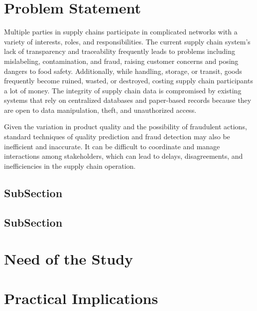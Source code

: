 \section{Problem Statement}
\noindent
Multiple parties in supply chains participate in complicated networks with a variety of interests, roles, and responsibilities. 
The current supply chain system's lack of transparency and traceability frequently leads to problems including mislabeling, 
contamination, and fraud, raising customer concerns and posing dangers to food safety. Additionally, while handling, 
storage, or transit, goods frequently become ruined, wasted, or destroyed, costing supply chain participants a lot of money. 
The integrity of supply chain data is compromised by existing systems that rely on centralized databases and paper-based 
records because they are open to data manipulation, theft, and unauthorized access.
\par Given the variation in product quality and the possibility of fraudulent actions, standard techniques of quality prediction 
and fraud detection may also be inefficient and inaccurate. It can be difficult to coordinate and manage interactions among 
stakeholders, which can lead to delays, disagreements, and inefficiencies in the supply chain operation.


\subsection{SubSection}
\lipsum[4]


\subsection{SubSection}
\lipsum[1-3]


\section{Need of the Study}
\lipsum[7]


\section{Practical Implications}
\noindent  
\lipsum[2]

